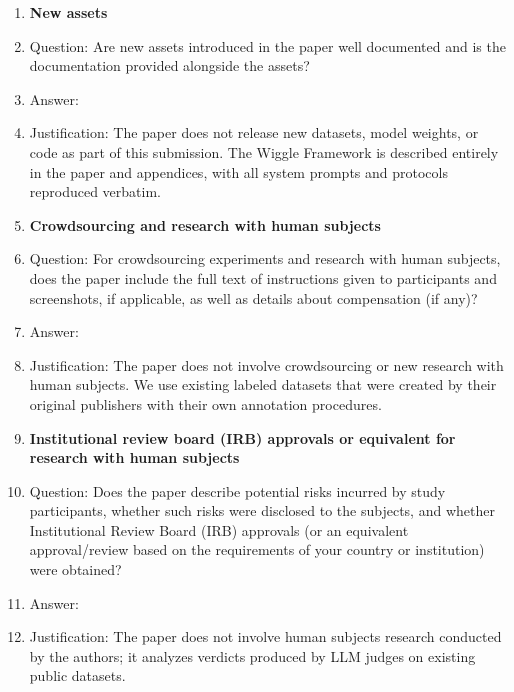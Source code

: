 \begin{enumerate}
\item {\bf New assets}
    \item[] Question: Are new assets introduced in the paper well documented and is the documentation provided alongside the assets?
    \item[] Answer: \answerNA{}
    \item[] Justification: The paper does not release new datasets, model weights, or code as part of this submission. The Wiggle Framework is described entirely in the paper and appendices, with all system prompts and protocols reproduced verbatim.

\item {\bf Crowdsourcing and research with human subjects}
    \item[] Question: For crowdsourcing experiments and research with human subjects, does the paper include the full text of instructions given to participants and screenshots, if applicable, as well as details about compensation (if any)?
    \item[] Answer: \answerNA{}
    \item[] Justification: The paper does not involve crowdsourcing or new research with human subjects. We use existing labeled datasets that were created by their original publishers with their own annotation procedures.

\item {\bf Institutional review board (IRB) approvals or equivalent for research with human subjects}
    \item[] Question: Does the paper describe potential risks incurred by study participants, whether such risks were disclosed to the subjects, and whether Institutional Review Board (IRB) approvals (or an equivalent approval/review based on the requirements of your country or institution) were obtained?
    \item[] Answer: \answerNA{}
    \item[] Justification: The paper does not involve human subjects research conducted by the authors; it analyzes verdicts produced by LLM judges on existing public datasets.


\end{enumerate}
